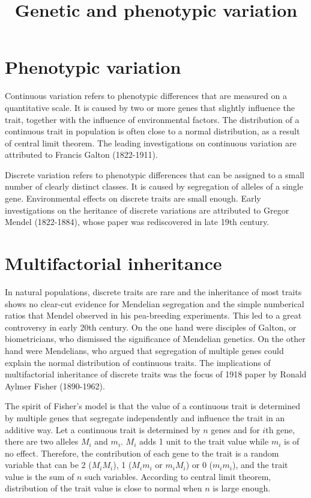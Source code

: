 \documentclass[11pt]{article}
\title{Genetic and phenotypic variation}
\author{}
\date{}
\begin{document}
\begin{sloppypar}
  \maketitle

  \linenumbers
\section{Phenotypic variation}
Continuous variation refers to phenotypic differences that are measured on a quantitative scale. 
It is caused by two or more genes that slightly influence the trait, together with the influence of environmental factors. 
The distribution of a continuous trait in population is often close to a normal distribution, as a result of central limit theorem. 
The leading investigations on continuous variation are attributed to Francis Galton (1822-1911). 

\par

Discrete variation refers to phenotypic differences that can be assigned to a small number of clearly distinct classes. 
It is caused by segregation of alleles of a single gene. 
Environmental effects on discrete traits are small enough. 
Early investigations on the heritance of discrete variations are attributed to Gregor Mendel (1822-1884), whose paper was rediscovered in late 19th century.

\section{Multifactorial inheritance}
In natural populations, discrete traits are rare and the inheritance of most traits shows no clear-cut evidence for Mendelian segregation and the simple numberical ratios that Mendel observed in his pea-breeding experiments. 
This led to a great controversy in early 20th century. 
On the one hand were disciples of Galton, or biometricians, who dismissed the significance of Mendelian genetics. 
On the other hand were Mendelians, who argued that segregation of multiple genes could explain the normal distribution of continuous traits. 
The implications of multifactorial inheritance of discrete traits was the focus of 1918 paper by Ronald Aylmer Fisher (1890-1962). 

\par

The spirit of Fisher's model is that the value of a continuous trait is determined by multiple genes that segregate independently and influence the trait in an additive way. 
Let a continuous trait is determined by $n$ genes and for $i$th gene, there are two alleles $M_i$ and $m_i$. 
$M_i$ adds 1 unit to the trait value while $m_i$ is of no effect. 
Therefore, the contribution of each gene to the trait is a random variable that can be 2 ($M_iM_i$), 1 ($M_im_i$ or $m_iM_i$) or 0 ($m_im_i$), and the trait value is the sum of $n$ such variables. 
According to central limit theorem, distribution of the trait value is close to normal when $n$ is large enough. 


\end{sloppypar}
\end{document}
